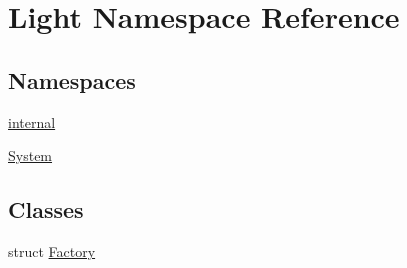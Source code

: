 \hypertarget{namespace_light}{}\section{Light Namespace Reference}
\label{namespace_light}
\subsection*{Namespaces}
\begin{DoxyCompactItemize}
\item 
 \mbox{\hyperlink{namespace_light_1_1internal}{internal}}
\item 
 \mbox{\hyperlink{namespace_light_1_1_system}{System}}
\end{DoxyCompactItemize}
\subsection*{Classes}
\begin{DoxyCompactItemize}
\item 
struct \mbox{\hyperlink{struct_light_1_1_factory}{Factory}}
\end{DoxyCompactItemize}
